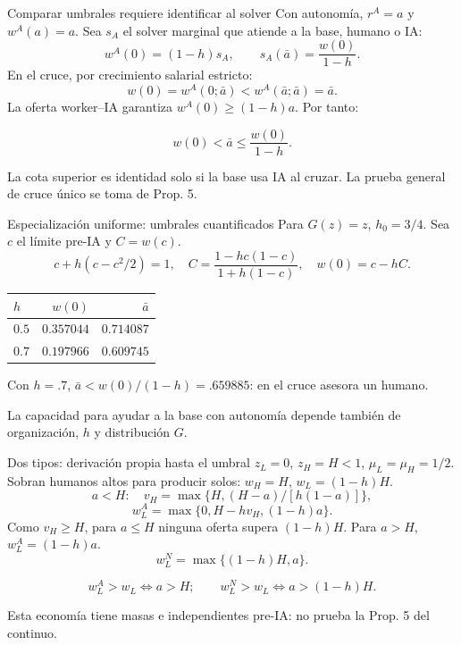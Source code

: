 \documentclass[aspectratio=169,11pt]{beamer}
\begin{document}
\begin{frame}{Comparar umbrales requiere identificar al solver}
\small
Con autonomía, $r^A=a$ y $w^A(a)=a$. Sea $s_A$ el solver marginal que atiende a la base, humano o IA:
\[
w^A(0)=(1-h)s_A,\qquad s_A(\bar a)=\frac{w(0)}{1-h}.
\]
En el cruce, por crecimiento salarial estricto:
\[
 w(0)=w^A(0;\bar a)<w^A(\bar a;\bar a)=\bar a.
\]
La oferta worker--IA garantiza $w^A(0)\ge(1-h)a$. Por tanto:
\begin{keybox}
\[
\boxed{w(0)<\bar a\le\frac{w(0)}{1-h}}.
\]
\end{keybox}
La cota superior es identidad solo si la base usa IA al cruzar. La prueba general de cruce único se toma de Prop. 5.
\end{frame}

\begin{frame}{Especialización uniforme: umbrales cuantificados}
\small
Para $G(z)=z$, $h_0=3/4$. Sea $c$ el límite pre-IA y $C=w(c)$.
\[
c+h(c-c^2/2)=1,\quad
C=\frac{1-hc(1-c)}{1+h(1-c)},\quad w(0)=c-hC.
\]
\begin{center}
\begin{tabular}{lrr}
\toprule
$h$ & $w(0)$ & $\bar a$ \\
\midrule
$0.5$ & $0.357044$ & $0.714087$ \\
$0.7$ & $0.197966$ & $0.609745$ \\
\bottomrule
\end{tabular}
\end{center}
Con $h=.7$, $\bar a<w(0)/(1-h)=.659885$: en el cruce asesora un humano.
\begin{keybox}La capacidad para ayudar a la base con autonomía depende también de organización, $h$ y distribución $G$.\end{keybox}
\end{frame}

\begin{frame}{Dos tipos: derivación propia hasta el umbral}
\small
$z_L=0$, $z_H=H<1$, $\mu_L=\mu_H=1/2$. Sobran humanos altos para producir solos: $w_H=H$, $w_L=(1-h)H$.
\[
 a<H:\quad v_H=\max\{H,(H-a)/[h(1-a)]\},
\]
\[
 w_L^A=\max\{0,H-hv_H,(1-h)a\}.
\]
Como $v_H\ge H$, para $a\le H$ ninguna oferta supera $(1-h)H$. Para $a>H$, $w_L^A=(1-h)a$.
\[
w_L^N=\max\{(1-h)H,a\}.
\]
\begin{keybox}
\[
w_L^A>w_L\iff a>H;\qquad w_L^N>w_L\iff a>(1-h)H.
\]
\end{keybox}
Esta economía tiene masas e independientes pre-IA: no prueba la Prop. 5 del continuo.
\end{frame}
\end{document}
